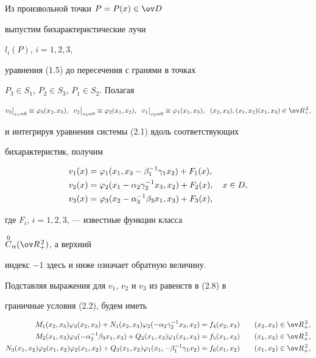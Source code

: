 Из произвольной точки $P=P(x)\in\ov D$


выпустим бихарактеристические лучи


$l_i(P)$, $i=1,2,3$,


уравнения (1.5) до пересечения с гранями в точках


$P_3\in S_1$, $P_2\in S_3$, $P_1\in S_2$. Полагая


$$


v_3\big|_{x_1=0}\equiv\varphi_3(x_2,x_3),\ \;


v_2\big|_{x_3=0}\equiv\varphi_2(x_1,x_2),\ \;


v_1\big|_{x_2=0}\equiv\varphi_1(x_1,x_3),\ \;


(x_2,x_3),(x_1,x_2)(x_1,x_3)\in\ov R^{\,2}_+,


$$


и интегрируя уравнения системы (2.1) вдоль соответствующих


бихарактеристик, получим


\begin{align}


v_1(x)&=\varphi_1(x_1,x_3-\beta^{-1}_1\gamma_1x_2)+F_1(x),\notag\\


v_2(x)&=\varphi_2(x_1-\alpha_2\gamma^{-1}_2x_3,x_2)+


F_2(x),\quad x\in D, \\


v_3(x)&=\varphi_3(x_2-\alpha^{-1}_3\beta_3x_1,x_3)+F_3(x),\notag


\end{align}


где $F_i$, $i=1,2,3$, --- известные функции класса


$\OC_\alpha(\ov R^{\,2}_+)$, а верхний


индекс $-1$ здесь и ниже означает обратную величину.





Подставляя выражения для $v_1$, $v_2$ и $v_3$ из равенств в (2.8) в


граничные условия (2.2), будем иметь


\begin{alignat*}{2}


M_1(x_2,x_3)\varphi_3(x_2,x_3)+N_1(x_2,x_3)


\varphi_2(-\alpha_2\gamma^{-1}_2x_3,x_2)&=f_4(x_2,x_3) &\quad


(x_2,x_3)&\in\ov R^{\,2}_+, \\


M_2(x_1,x_3)\varphi_3(-\alpha^{-1}_3\beta_3x_1,x_3)+


Q_2(x_1,x_3)\varphi_1(x_1,x_3)&=f_5(x_1,x_3) &\quad


(x_1,x_3)&\in\ov R^{\,2}_+, \\


N_3(x_1,x_2)\varphi_2(x_1,x_2)\varphi_2(x_1,x_2)+


Q_3(x_1,x_2)\varphi_1(x_1,-\beta^{-1}_1\gamma_1x_2)&=


f_6(x_1,x_2) &\quad (x_1,x_2)&\in\ov R^{\,2}_+,


\end{alignat*}


